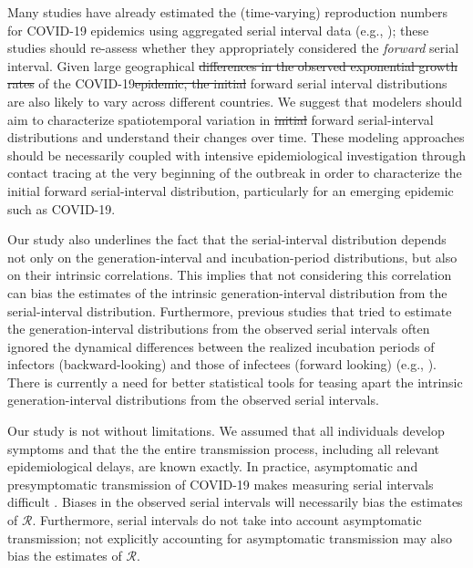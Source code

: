 \documentclass[12pt]{article}
\newcommand{\RR}{\ensuremath{{\mathcal R}}\xspace}
\providecommand{\DIFaddtex}[1]{{\protect\color{blue}\uwave{#1}}} %
\providecommand{\DIFdeltex}[1]{{\protect\color{red}\sout{#1}}}                      %
\providecommand{\DIFaddbegin}{} %
\providecommand{\DIFaddend}{} %
\providecommand{\DIFdelbegin}{} %
\providecommand{\DIFdelend}{} %
\providecommand{\DIFadd}[1]{\texorpdfstring{\DIFaddtex{#1}}{#1}} %
\providecommand{\DIFdel}[1]{\texorpdfstring{\DIFdeltex{#1}}{}} %
\newcommand{\DIFscaledelfig}{0.5}
\newlength{\DIFdelgraphicswidth} %
\newlength{\DIFdelgraphicsheight} %
\newcommand{\DIFaddincludegraphics}[2][]{{\color{blue}\fbox{\DIFOincludegraphics[#1]{#2}}}} %
\newcommand{\DIFdelincludegraphics}[2][]{%
\sbox{\DIFdelgraphicsbox}{\DIFOincludegraphics[#1]{#2}}%
\settoboxwidth{\DIFdelgraphicswidth}{\DIFdelgraphicsbox} %
\settoboxtotalheight{\DIFdelgraphicsheight}{\DIFdelgraphicsbox} %
\scalebox{\DIFscaledelfig}{%
\parbox[b]{\DIFdelgraphicswidth}{\usebox{\DIFdelgraphicsbox}\\[-\baselineskip] \rule{\DIFdelgraphicswidth}{0em}}\llap{\resizebox{\DIFdelgraphicswidth}{\DIFdelgraphicsheight}{%
\setlength{\unitlength}{\DIFdelgraphicswidth}%
\begin{picture}(1,1)%
\thicklines\linethickness{2pt} %
{\color[rgb]{1,0,0}\put(0,0){\framebox(1,1){}}}%
{\color[rgb]{1,0,0}\put(0,0){\line( 1,1){1}}}%
{\color[rgb]{1,0,0}\put(0,1){\line(1,-1){1}}}%
\end{picture}%
}\hspace*{3pt}}} %
} %
\DeclareRobustCommand{\DIFaddbegin}{\DIFOaddbegin \let\includegraphics\DIFaddincludegraphics} %
\DeclareRobustCommand{\DIFaddend}{\DIFOaddend \let\includegraphics\DIFOincludegraphics} %
\DeclareRobustCommand{\DIFdelbegin}{\DIFOdelbegin \let\includegraphics\DIFdelincludegraphics} %
\DeclareRobustCommand{\DIFdelend}{\DIFOaddend \let\includegraphics\DIFOincludegraphics} %
\begin{document}
\DIFaddend Many studies have already estimated the (time-varying) reproduction numbers for COVID-19 epidemics using aggregated serial interval data (e.g., \cite{tempvar,du2020serial,pan2020jama,zhang2020evolving});
these studies should \DIFaddbegin \DIFadd{also }\DIFaddend re-assess whether they appropriately considered the \emph{forward} serial interval.
Given large geographical \DIFdelbegin \DIFdel{differences in the observed exponential growth rates }\DIFdelend \DIFaddbegin \DIFadd{variation in the spread }\DIFaddend of the COVID-19\DIFdelbegin \DIFdel{epidemic, the initial }\DIFdelend \DIFaddbegin \DIFadd{, the }\DIFaddend forward serial interval distributions are also likely to vary across different countries.
We suggest that modelers should aim to characterize spatiotemporal variation in \DIFdelbegin \DIFdel{initial }\DIFdelend forward serial-interval distributions and understand their changes over time.
These modeling approaches should be necessarily coupled with intensive epidemiological investigation through contact tracing at the very beginning of the outbreak in order to characterize the initial forward serial-interval distribution, particularly for an emerging epidemic such as COVID-19.

Our study also underlines the fact that the serial-interval distribution depends not only on the generation-interval and incubation-period distributions, but also on their intrinsic correlations.
This implies that not considering this correlation can bias the estimates of the intrinsic generation-interval distribution from the serial-interval distribution.
Furthermore, previous studies that tried to estimate the generation-interval distributions from the observed serial intervals often ignored the dynamical differences between the realized incubation periods of infectors (backward-looking) and those of infectees (forward looking) (e.g., \cite{klinkenberg2011correlation, ganyani2020estimating}).
There is currently a need for better statistical tools for teasing apart the intrinsic generation-interval distributions from the observed serial intervals.

Our study is not without limitations.
We assumed that all individuals develop symptoms and that the the entire transmission process, including all relevant epidemiological delays, are known exactly.
In practice, asymptomatic and presymptomatic transmission of COVID-19 makes measuring serial intervals difficult \citep{bai2020presumed,he2020temporal,wei2020presymptomatic}.
Biases in the observed serial intervals will necessarily bias the estimates of \RR. 
Furthermore, serial intervals do not take into account asymptomatic transmission; 
not explicitly accounting for asymptomatic transmission may also bias the estimates of \RR \citep{park2020time}.
\end{document}
